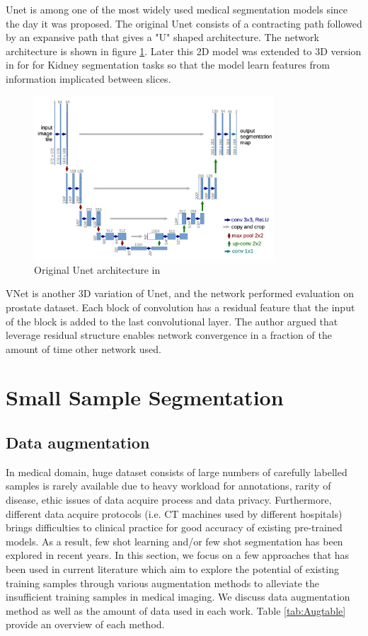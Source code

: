 Unet \cite{ronneberger_u-net_2015} is among one of the most widely used medical segmentation models since the day it was proposed. The original Unet consists of a contracting path followed by an expansive path that gives a "U" shaped architecture. The network architecture is shown in figure \ref{fig:unet-arch}.
Later this 2D model was extended to 3D version in \cite{ourselin_3d_2016} for for Kidney segmentation tasks so that the model learn features from information implicated between slices.\\
\begin{figure}
\centering
\includegraphics[width = 0.8\textwidth]{img/Unet_architecture}
\caption{Original Unet architecture in \cite{ronneberger_u-net_2015}}
\label{fig:unet-arch}
\end{figure}

VNet \cite{milletari_v-net_2016} is another 3D variation of Unet, and the network performed evaluation on prostate dataset. Each block of convolution has a residual feature that the input of the block is added to the last convolutional layer. The author argued that leverage residual structure enables network convergence in a fraction of the amount of time other network used.


\section{Small Sample Segmentation}

\subsection{Data augmentation}
In medical domain, huge dataset consists of large numbers of carefully labelled samples is rarely available due to heavy workload for annotations, rarity of disease, ethic issues of data acquire process and data privacy. Furthermore, different data acquire protocols (i.e. CT machines used by different hospitals) brings difficulties to clinical practice for good accuracy of existing pre-trained models. As a result, few shot learning and/or few shot segmentation has been explored in recent years. 
In this section, we focus on a few approaches that has been used in current literature which aim to explore the potential of existing training samples through various augmentation methods to alleviate the insufficient training samples in medical imaging. We discuss data augmentation method as well as the amount of data used in each work. Table \ref{tab:Augtable} provide an overview of each method.

